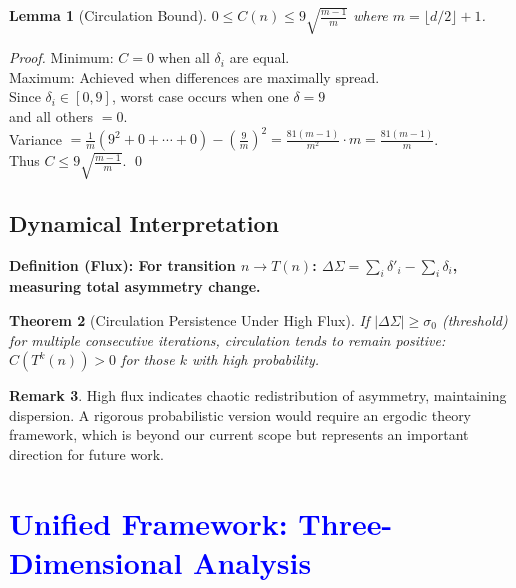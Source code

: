 \documentclass[11pt,a4paper]{article}
\theoremstyle{plain}
\newtheorem{theorem}{Theorem}[section]
\newtheorem{lemma}[theorem]{Lemma}
\theoremstyle{definition}
\newtheorem{remark}[theorem]{Remark}
\newenvironment{definitionbox}
    {\begin{center}\begin{minipage}{0.95\textwidth}\color{blue}\bfseries}
    {\end{minipage}\end{center}}
\begin{document}
\begin{lemma}[Circulation Bound]\label{lem:circ_bound}
$0 \leq C(n) \leq 9\sqrt{\frac{m-1}{m}}$ where $m = \lfloor d/2 \rfloor + 1$.
\end{lemma}

\begin{proof}
Minimum: $C = 0$ when all $\delta_i$ are equal.\\
Maximum: Achieved when differences are maximally spread. \\
Since $\delta_i \in [0,9]$, worst case occurs when one $\delta = 9$ \\
and all others $= 0$.\\
Variance $= \frac{1}{m}(9^2 + 0 + \cdots + 0) - \left(\frac{9}{m}\right)^2 = \frac{81(m-1)}{m^2} \cdot m = \frac{81(m-1)}{m}$.\\
Thus $C \leq 9\sqrt{\frac{m-1}{m}}$. \qed
\end{proof}

\subsection{Dynamical Interpretation}

\begin{definitionbox}
\textbf{Definition (Flux):}
For transition $n \to T(n)$: $\Delta\Sigma = \sum_i \delta'_i - \sum_i \delta_i$, measuring total asymmetry change.
\end{definitionbox}

\begin{theorem}[Circulation Persistence Under High Flux]\label{thm:circ_persist}
If $|\Delta\Sigma| \geq \sigma_0$ (threshold) for multiple consecutive iterations, circulation tends to remain positive: $C(T^k(n)) > 0$ for those $k$ with high probability.
\end{theorem}

\begin{remark}
High flux indicates chaotic redistribution of asymmetry, maintaining dispersion. A rigorous probabilistic version would require an ergodic theory framework, which is beyond our current scope but represents an important direction for future work.
\end{remark}

\section{\textcolor{blue}{Unified Framework: Three-Dimensional Analysis}}
\end{document}
